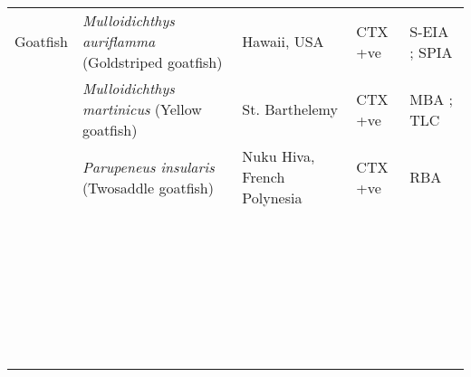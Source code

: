 \documentclass[12pt]{article}
\begin{document}
\begin{longtable}{  | p{2cm} | p{3cm} | p{4.5cm}  | p{2cm} | p{3cm}  | }
  \hline
Goatfish  & \emph{Mulloidichthys auriflamma} (Goldstriped goatfish) & Hawaii, USA \cite{hokama1990simplified} & CTX +ve \cite{hokama1990simplified}  & S-EIA \cite{hokama1990simplified}; SPIA \cite{hokama1990simplified}  \\
  & \emph{Mulloidichthys martinicus} (Yellow goatfish) & St. Barthelemy \cite{vernoux1986heterogeneity}  &  CTX +ve \cite{vernoux1986heterogeneity}  &  MBA \cite{vernoux1986heterogeneity}; TLC \cite{vernoux1986heterogeneity} \\
  &  \emph{Parupeneus insularis} (Twosaddle goatfish) & Nuku Hiva, French Polynesia \cite{darius2007ciguatera} & CTX +ve \cite{darius2007ciguatera}  &  RBA \cite{darius2007ciguatera} \\
  \hline
  & \emph{}  &  &  & \\
  & \emph{} &  &  & \\
  &  \emph{} &  &  & \\
  & \emph{}  &  &  & \\
  & \emph{} &  &  & \\
  &  \emph{} &  &  & \\
  & \emph{}  &  &  & \\
  & \emph{} &  &  & \\
  &  \emph{} &  &  & \\
  & \emph{}  &  &  & \\
  & \emph{} &  &  & \\
  &  \emph{} &  &  & \\
  & \emph{}  &  &  & \\
  & \emph{} &  &  & \\
  &  \emph{} &  &  & \\
  & \emph{}  &  &  & \\
  & \emph{} &  &  & \\
  &  \emph{} &  &  & \\
  & \emph{}  &  &  & \\
  & \emph{} &  &  & \\
  &  \emph{} &  &  & \\
  & \emph{}  &  &  & \\
  & \emph{} &  &  & \\
  &  \emph{} &  &  & \\
  & \emph{}  &  &  & \\
  & \emph{} &  &  & \\
  &  \emph{} &  &  & \\
  & \emph{}  &  &  & \\
  & \emph{} &  &  & \\

\end{longtable}
\end{document}
